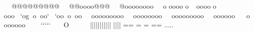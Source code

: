         @ @ @ @ @ @ @ @ @      @ @ o o o o @ @ @      @ o o o o o o o o      o     o o o o   o     o o o o   o     o o o    ` o g   o   o o `    ` o o   o   o o      o o o o o o o o o      o o o o   o o o o      o o o o o o o o o      o o o       o o o       o o o o o o o         ` ` ` ` `        O              |||||||||     ||    |||     |              ==    =         = ==      {         }                                                                                          .....                   